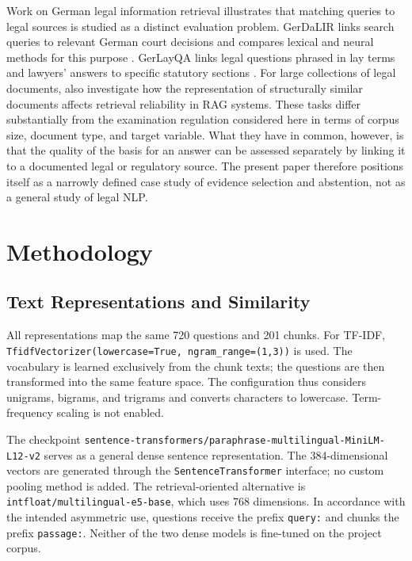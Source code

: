 \documentclass[11pt]{article}
\begin{document}
Work on German legal information retrieval illustrates that matching queries to legal sources is studied as a distinct evaluation problem. GerDaLIR links search queries to relevant German court decisions and compares lexical and neural methods for this purpose \citep{wrzalik-krechel-2021-gerdalir}. GerLayQA links legal questions phrased in lay terms and lawyers' answers to specific statutory sections \citep{buttner-habernal-2024-answering}. For large collections of legal documents, \citet{reuter-etal-2025-towards} also investigate how the representation of structurally similar documents affects retrieval reliability in RAG systems. These tasks differ substantially from the examination regulation considered here in terms of corpus size, document type, and target variable. What they have in common, however, is that the quality of the basis for an answer can be assessed separately by linking it to a documented legal or regulatory source. The present paper therefore positions itself as a narrowly defined case study of evidence selection and abstention, not as a general study of legal NLP.


\section{Methodology}

\subsection{Text Representations and Similarity}

All representations map the same 720 questions and 201 chunks. For TF-IDF, \texttt{TfidfVectorizer(lowercase=True, ngram\_range=(1,3))} is used. The vocabulary is learned exclusively from the chunk texts; the questions are then transformed into the same feature space. The configuration thus considers unigrams, bigrams, and trigrams and converts characters to lowercase. Term-frequency scaling is not enabled.

The checkpoint \nolinkurl{sentence-transformers/paraphrase-multilingual-MiniLM-L12-v2} serves as a general dense sentence representation. The 384-dimensional vectors are generated through the \texttt{SentenceTransformer} interface; no custom pooling method is added. The retrieval-oriented alternative is \texttt{intfloat/multilingual-e5-base}, which uses 768 dimensions. In accordance with the intended asymmetric use, questions receive the prefix \texttt{query:} and chunks the prefix \texttt{passage:}. Neither of the two dense models is fine-tuned on the project corpus.
\end{document}
